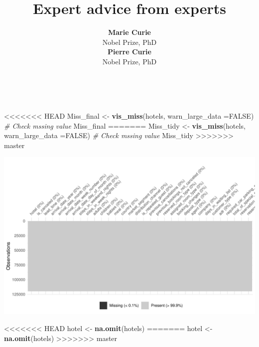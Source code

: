 \documentclass[11pt,a4paper,]{article}
\title{Expert advice from experts}
\author{\sf\Large\textbf{ Marie Curie}\\ {\sf\large Nobel Prize, PhD\\[0.5cm]} \sf\Large\textbf{ Pierre Curie}\\ {\sf\large Nobel Prize, PhD\\[0.5cm]}}
\date{\sf\Date~\Month~\Year}
\makeatletter
\newenvironment{Shaded}{\begin{snugshade}}{\end{snugshade}}
\newcommand{\CommentTok}[1]{\textcolor[rgb]{0.56,0.35,0.01}{\textit{#1}}}
\newcommand{\DataTypeTok}[1]{\textcolor[rgb]{0.13,0.29,0.53}{#1}}
\newcommand{\KeywordTok}[1]{\textcolor[rgb]{0.13,0.29,0.53}{\textbf{#1}}}
\newcommand{\NormalTok}[1]{#1}
\newcommand{\OtherTok}[1]{\textcolor[rgb]{0.56,0.35,0.01}{#1}}
\newcommand{\StringTok}[1]{\textcolor[rgb]{0.31,0.60,0.02}{#1}}
\def\titlepage{\front{\expandafter{\@title}}{\@author}{\@organization}}
\makeatother
\begin{document}
\titlepage

\begin{Shaded}
\begin{Highlighting}[]
<<<<<<< HEAD
\NormalTok{Miss_final <-}\StringTok{ }\KeywordTok{vis_miss}\NormalTok{(hotels, }\DataTypeTok{warn_large_data =}\OtherTok{FALSE}\NormalTok{) }\CommentTok{# Check mssing value }
\NormalTok{Miss_final}
=======
\NormalTok{Miss\_tidy \textless{}{-}}\StringTok{ }\KeywordTok{vis\_miss}\NormalTok{(hotels, }\DataTypeTok{warn\_large\_data =}\OtherTok{FALSE}\NormalTok{) }\CommentTok{\# Check mssing value }
\NormalTok{Miss\_tidy}
>>>>>>> master
\end{Highlighting}
\end{Shaded}

\includegraphics{tidy_files/figure-latex/check NA-1.pdf}

\begin{Shaded}
\begin{Highlighting}[]
<<<<<<< HEAD
\NormalTok{hotel <-}\StringTok{ }\KeywordTok{na.omit}\NormalTok{(hotels)}
=======
\NormalTok{hotel \textless{}{-}}\StringTok{ }\KeywordTok{na.omit}\NormalTok{(hotels)}
>>>>>>> master
\end{Highlighting}
\end{Shaded}
\end{document}
